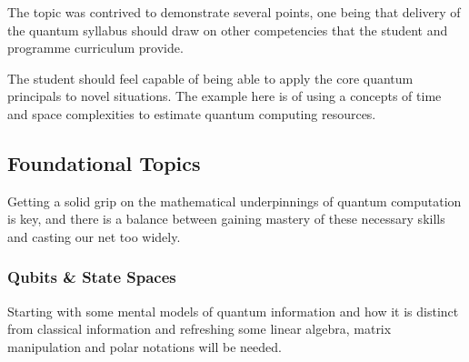 
The topic was contrived to demonstrate several points,
one being that delivery of the quantum syllabus should draw on other competencies
that the student and programme curriculum provide.

The student should feel capable of being able to apply the core quantum principals to novel situations.  
The example here is of using a concepts of time and space complexities to estimate quantum computing resources.

\subsection{Foundational Topics}

Getting a solid grip on the mathematical underpinnings of quantum computation is key, 
and there is a balance between gaining mastery of these necessary skills and casting our net too widely.


\subsubsection{Qubits \& State Spaces}

Starting with some mental models of quantum information and how it is distinct from classical information
and refreshing some linear algebra, matrix manipulation and polar notations will be needed.  

